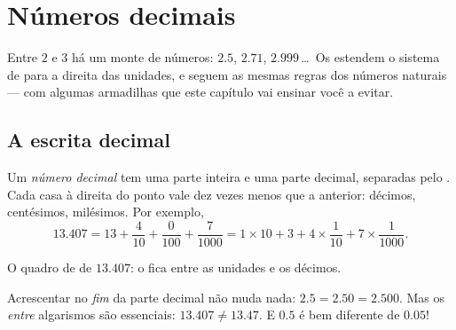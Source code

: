\chapter{Números decimais}\label{ch:g6:decimals}

Entre $2$ e $3$ há um monte de números: $2.5$, $2.71$,
$2.999$\,\dots\ Os  estendem o sistema de  para a direita das unidades, e seguem as mesmas regras dos
números naturais --- com algumas armadilhas que este capítulo vai
ensinar você a evitar.

\section{A escrita decimal}

\begin{definition}\label{def:g6:decimals:places}
Um \emph{número decimal} tem uma parte inteira e
uma parte decimal, separadas pelo . Cada casa à direita do
ponto vale dez vezes menos que a anterior: décimos, centésimos,
milésimos. Por exemplo,
\[
13.407 = 13 + \frac{4}{10} + \frac{0}{100} + \frac{7}{1000}
= 1 \times 10 + 3 + 4 \times \frac{1}{10} + 7 \times \frac{1}{1000}.
\]
\end{definition}

\begin{omfigure}

{\small O quadro de  de $13.407$: o  fica
entre as unidades e os décimos.}
\end{omfigure}

\begin{remark}
Acrescentar  no \emph{fim} da parte decimal não muda nada:
$2.5 = 2.50 = 2.500$. Mas os  \emph{entre} algarismos são
essenciais: $13.407 \neq 13.47$. E $0.5$ é bem diferente de $0.05$!
\end{remark}

